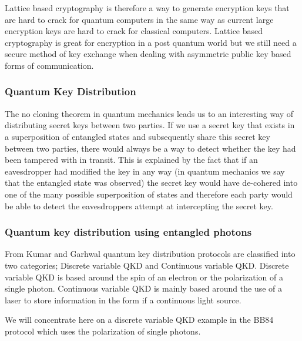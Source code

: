 \documentclass{article}
\begin{document}
\vspace{5mm}

Lattice based cryptography is therefore a way to generate encryption keys that are hard to crack for quantum computers in the same way as current large encryption keys are hard to crack for classical computers.  Lattice based cryptography is great for encryption in a post quantum world but we still need a secure method of key exchange when dealing with asymmetric public key based forms of communication.  

\subsubsection{Quantum Key Distribution}
The no cloning theorem in quantum mechanics leads us to an interesting way of distributing secret keys between two parties. If we use a secret key that exists in a superposition of entangled states and subsequently share this secret key between two parties, there would always be a way to detect whether the key had been tampered with in transit. This is explained by the fact that if an eavesdropper had modified the key in any way (in quantum mechanics we say that the entangled state was observed) the secret key would have de-cohered into one of the many possible superposition of states and therefore each party would be able to detect the eavesdroppers attempt at intercepting the secret key. 

\subsubsection{Quantum key distribution using entangled photons}
From Kumar and Garhwal \cite{Kumar2021State-of-the-ArtCryptography} quantum key distribution protocols are classified into two categories; Discrete variable QKD and Continuous variable QKD. Discrete variable QKD is based around the spin of an electron or the polarization of a single photon. Continuous variable QKD is mainly based around the use of a laser to store information in the form if a continuous light source.

We will concentrate here on a discrete variable QKD example in the BB84 protocol which uses the polarization of single photons.  
\end{document}
